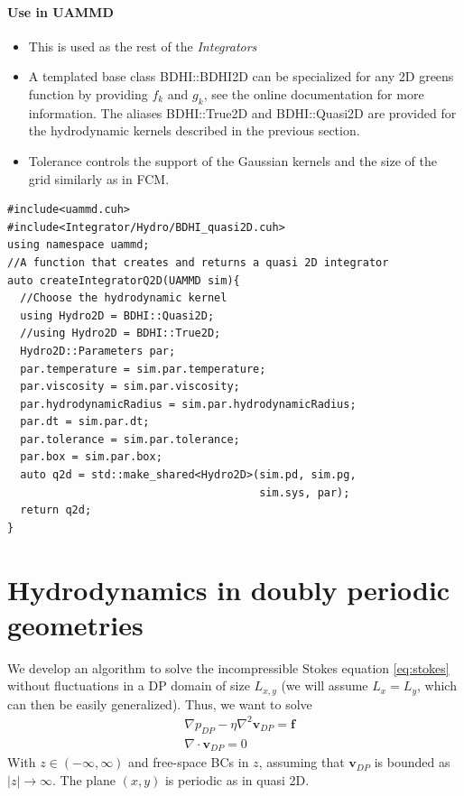 \documentclass[ twoside,openright,titlepage,numbers=noenddot,%
headinclude,footinclude,cleardoublepage=empty,abstract=on,
BCOR=5mm,paper=a4,fontsize=11pt, dvipsnames
]{scrreprt}
\def\ucpp{uammd_cpp_lexer.py:UAMMDCppLexer -x}
\renewcommand{\vec}[1]{\bm{#1}}
\newcommand{\fvel}{v}
\begin{document}
\subsubsection*{Use in UAMMD}
\begin{itemize}
\item This is used as the rest of the \emph{Integrators}
\item A templated base class BDHI::BDHI2D can be specialized for any 2D greens function by providing $f_k$ and $g_k$, see the online documentation for more information. The aliases BDHI::True2D and BDHI::Quasi2D are provided for the hydrodynamic kernels described in the previous section.
\item Tolerance controls the support of the Gaussian kernels and the size of the grid similarly as in \gls{FCM}.
\end{itemize}
\begin{verbatim}
#include<uammd.cuh>
#include<Integrator/Hydro/BDHI_quasi2D.cuh>
using namespace uammd;
//A function that creates and returns a quasi 2D integrator
auto createIntegratorQ2D(UAMMD sim){
  //Choose the hydrodynamic kernel
  using Hydro2D = BDHI::Quasi2D;
  //using Hydro2D = BDHI::True2D;
  Hydro2D::Parameters par;
  par.temperature = sim.par.temperature;
  par.viscosity = sim.par.viscosity;
  par.hydrodynamicRadius = sim.par.hydrodynamicRadius;
  par.dt = sim.par.dt;
  par.tolerance = sim.par.tolerance;
  par.box = sim.par.box;
  auto q2d = std::make_shared<Hydro2D>(sim.pd, sim.pg, 
                                       sim.sys, par);
  return q2d;
}
\end{verbatim}
\chapter{Hydrodynamics in doubly periodic geometries}
We develop an algorithm to solve the incompressible Stokes equation \eqref{eq:stokes} without fluctuations in a \gls{DP} domain of size $L_{x,y}$ (we will assume $L_x=L_y$, which can then be easily generalized). Thus, we want to solve
\begin{equation}
  \label{eq:dpstokes}
  \begin{aligned}
    &\nabla p_{DP} - \eta\nabla^2\vec{\fvel}_{DP} = \vec{f}\\
    &\nabla\cdot\vec{\fvel}_{DP} = 0
\end{aligned}
\end{equation}
With $z\in(-\infty, \infty)$ and free-space \glspl{BC} in $z$, assuming that $\vec{\fvel}_{DP}$ is bounded as $|z|\rightarrow\infty$. The plane $(x,y)$ is periodic as in quasi 2D.
\end{document}
